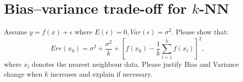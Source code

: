 \documentclass[11pt]{article}
\newcommand{\R}{\mathbb{R}}
\newcommand{\minimize}{\operatorname*{minimize\ }}
\newcommand{\mtx}[1]{\mathbf{#1}}
\newcommand{\vct}[1]{\mathbf{#1}}
\def \mI {\mtx{I}}
\def \mU {\mtx{U}}
\def \mX {\mtx{X}}
\def \vv {\vct{v}}
\def \R {\mathbb{R}}
\begin{document}

\section*{Bias–variance trade-off for $k$-NN}
Assume $y=f(x)+\epsilon$ where $E(\epsilon)=0, Var(\epsilon)=\sigma^2$. Please show that:
\begin{equation}
	Err(x_0)=\sigma^2+\frac{\sigma^2}{k}+[f(x_0)-\frac{1}{k}\sum_{l=1}^{k}f(x_l)]^2,
\end{equation}
where $x_l$ denotes the nearest neighbour data.  Please justify Bias and Variance change when $k$ increases and explain if necessary.
\end{document}
